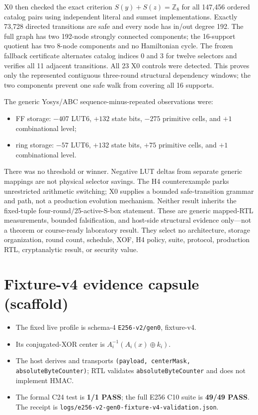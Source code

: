 X0 then checked the exact criterion $S(y)+S(z)=\mathbb{Z}_8$ for all 147,456
ordered catalog pairs using independent literal and sumset implementations.
Exactly 73,728 directed transitions are safe and every node has in/out degree
192. The full graph has two 192-node strongly connected components; the
16-support quotient has two 8-node components and no Hamiltonian cycle. The
frozen fallback certificate alternates catalog indices 0 and 3 for twelve
selectors and verifies all 11 adjacent transitions. All 23 X0 controls were
detected. This proves only the represented contiguous three-round structural
dependency windows; the two components prevent one safe walk from covering all
16 supports.

The generic Yosys/ABC sequence-minus-repeated observations were:
\begin{itemize}
  \item FF storage: $-407$ LUT6, $+132$ state bits, $-275$ primitive
        cells, and $+1$ combinational level;
  \item ring storage: $-57$ LUT6, $+132$ state bits, $+75$ primitive
        cells, and $+1$ combinational level.
\end{itemize}
There was no threshold or winner. Negative LUT deltas from separate generic
mappings are not physical selector savings. The H4 counterexample parks
unrestricted arithmetic switching; X0 supplies a bounded safe-transition
grammar and path, not a production evolution mechanism. Neither result inherits
the fixed-tuple four-round/25-active-S-box statement. These are generic
mapped-RTL measurements, bounded falsification, and host-side structural
evidence only---not a theorem or course-ready laboratory result. They select no
architecture, storage organization, round count, schedule, XOF, H4 policy,
suite, protocol, production RTL, cryptanalytic result, or security value.

\section{Fixture-v4 evidence capsule (scaffold)}

\begin{itemize}
  \item The fixed live profile is schema-4 \texttt{E256-v2/gen0}, fixture-v4.
  \item Its conjugated-XOR center is
        $A_i^{-1}(A_i(x)\oplus k_i)$.
  \item The host derives and transports
        \texttt{(payload, centerMask, absoluteByteCounter)}; RTL validates
        \texttt{absoluteByteCounter} and does not implement HMAC.
  \item The formal C24 test is \textbf{1/1 PASS}; the full E256 C10 suite is
        \textbf{49/49 PASS}. The receipt is
        \texttt{logs/e256-v2-gen0-fixture-v4-validation.json}.
\end{itemize}

